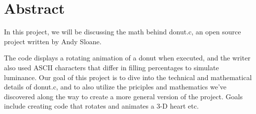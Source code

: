 \section{Abstract}
In this project, we will be discussing the math behind donut.c,
an open source project written by Andy Sloane.
\par
The code displays a rotating animation of a donut when executed, 
and the writer also used ASCII characters that differ in filling percentages to simulate luminance. 
Our goal of this project is to dive into the technical and mathematical details of donut.c, 
and to also utilize the priciples and mathematics we've discovered along the way to create a more general version of the project. 
Goals include creating code that rotates and animates a 3-D heart etc.